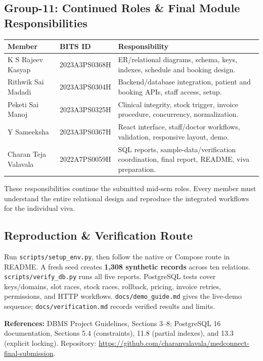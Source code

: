 \documentclass[10pt,a4paper]{article}
\begin{document}
\subsection{Group-11: Continued Roles \& Final Module Responsibilities}
{\small
\begin{tabularx}{\linewidth}{@{}p{3.05cm}p{2.65cm}X@{}}
\toprule \textbf{Member} & \textbf{BITS ID} & \textbf{Responsibility}\\\midrule
K S Rajeev Kasyap & 2023A3PS0368H & ER/relational diagrams, schema, keys, indexes, schedule and booking design.\\
Rithwik Sai Madadi & 2023A3PS0304H & Backend/database integration, patient and booking APIs, staff access, setup.\\
Peketi Sai Manoj & 2023A3PS0325H & Clinical integrity, stock trigger, invoice procedure, concurrency, normalization.\\
Y Sameeksha & 2023A3PS0367H & React interface, staff/doctor workflows, validation, responsive layout, demo.\\
Charan Teja Valavala & 2022A7PS0059H & SQL reports, sample-data/verification coordination, final report, README, viva preparation.\\\bottomrule
\end{tabularx}}
{\small These responsibilities continue the submitted mid-sem roles. Every member must understand the entire relational design and reproduce the integrated workflows for the individual viva.}

\subsection{Reproduction \& Verification Route}
{\small Run \texttt{scripts/setup\_env.py}, then follow the native or Compose route in README. A fresh seed creates \textbf{1,308 synthetic records} across ten relations. \texttt{scripts/verify\_db.py} runs all five reports. PostgreSQL tests cover keys/domains, slot races, stock races, rollback, pricing, invoice retries, permissions, and HTTP workflows. \texttt{docs/demo\_guide.md} gives the live-demo sequence; \texttt{docs/verification.md} records verified results and limits.}

{\footnotesize\color{graytext}\textbf{References:} DBMS Project Guidelines, Sections 3--8; PostgreSQL 16 documentation, Sections 5.4 (constraints), 11.8 (partial indexes), and 13.3 (explicit locking). Repository: \url{https://github.com/charanvalavala/medconnect-final-submission}.}
\end{document}
